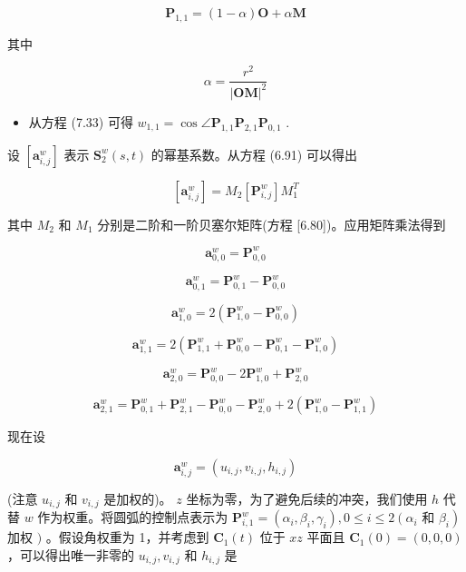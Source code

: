 \documentclass[../main.tex]{subfiles}
\begin{document}
\[
{\mathbf{P}}_{1,1} = \left( {1 - \alpha }\right) \mathbf{O} + \alpha \mathbf{M}
\]

其中

\[
\alpha  = \frac{{r}^{2}}{{\left| \mathbf{{OM}}\right| }^{2}}
\]

\begin{itemize}
\item 从方程 (7.33) 可得 \({w}_{1,1} = \cos \angle {\mathbf{P}}_{1,1}{\mathbf{P}}_{2,1}{\mathbf{P}}_{0,1}\) .
\end{itemize}

设 \(\left\lbrack  {\mathbf{a}}_{i,j}^{w}\right\rbrack\) 表示 \({\mathbf{S}}_{2}^{w}\left( {s,t}\right)\) 的幂基系数。从方程 (6.91) 可以得出

\[
\left\lbrack  {\mathbf{a}}_{i,j}^{w}\right\rbrack   = {M}_{2}\left\lbrack  {\mathbf{P}}_{i,j}^{w}\right\rbrack  {M}_{1}^{T}
\]

其中 \({M}_{2}\) 和 \({M}_{1}\) 分别是二阶和一阶贝塞尔矩阵(方程 [6.80])。应用矩阵乘法得到

\[
{\mathbf{a}}_{0,0}^{w} = {\mathbf{P}}_{0,0}^{w}
\]

\[
{\mathbf{a}}_{0,1}^{w} = {\mathbf{P}}_{0,1}^{w} - {\mathbf{P}}_{0,0}^{w}
\]

\[
{\mathbf{a}}_{1,0}^{w} = 2\left( {{\mathbf{P}}_{1,0}^{w} - {\mathbf{P}}_{0,0}^{w}}\right)
\]

\[
{\mathbf{a}}_{1,1}^{w} = 2\left( {{\mathbf{P}}_{1,1}^{w} + {\mathbf{P}}_{0,0}^{w} - {\mathbf{P}}_{0,1}^{w} - {\mathbf{P}}_{1,0}^{w}}\right)
\]

\[
{\mathbf{a}}_{2,0}^{w} = {\mathbf{P}}_{0,0}^{w} - 2{\mathbf{P}}_{1,0}^{w} + {\mathbf{P}}_{2,0}^{w}
\]

\[
{\mathbf{a}}_{2,1}^{w} = {\mathbf{P}}_{0,1}^{w} + {\mathbf{P}}_{2,1}^{w} - {\mathbf{P}}_{0,0}^{w} - {\mathbf{P}}_{2,0}^{w} + 2\left( {{\mathbf{P}}_{1,0}^{w} - {\mathbf{P}}_{1,1}^{w}}\right)  \tag{8.15}
\]

现在设

\[
{\mathbf{a}}_{i,j}^{w} = \left( {{u}_{i,j},{v}_{i,j},{h}_{i,j}}\right)  \tag{8.16}
\]

(注意 \({u}_{i,j}\) 和 \({v}_{i,j}\) 是加权的)。 \(z\) 坐标为零，为了避免后续的冲突，我们使用 \(h\) 代替 \(w\) 作为权重。将圆弧的控制点表示为 \({\mathbf{P}}_{i,1}^{w} = \left( {{\alpha }_{i},{\beta }_{i},{\gamma }_{i}}\right) ,0 \leq  i \leq  2\left( {\alpha }_{i}\right.\) 和 \(\left. {\beta }_{i}\right)\) 加权 \()\) 。假设角权重为 1，并考虑到 \({\mathbf{C}}_{1}\left( t\right)\) 位于 \({xz}\) 平面且 \({\mathbf{C}}_{1}\left( 0\right)  = \left( {0,0,0}\right)\) ，可以得出唯一非零的 \({u}_{i,j},{v}_{i,j}\) 和 \({h}_{i,j}\) 是
\end{document}
